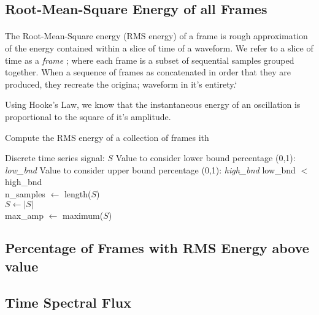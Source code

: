 \documentclass[12pt,letterpaper]{article}
\begin{document}


\subsection{Root-Mean-Square Energy of all Frames}

\paragraph*{}The Root-Mean-Square energy (RMS energy) of a frame is rough approximation of the energy contained within a slice of time of a waveform. We refer to a slice of time as a \textit{frame} \cite{Kahn}; where each frame is a subset of sequential samples grouped together. When a sequence of frames as concatenated in order that they are produced, they recreate the origina; waveform in it's entirety.`

 Using Hooke's Law, we know that the instantaneous energy of an oscillation is proportional to the square of it's amplitude.

\begin{algorithm}
\label{RMS Energy of Frames}
\caption{Compute the RMS energy of a collection of frames ith}

\begin{algorithmic}

\REQUIRE Discrete time series signal: $S$ 
\REQUIRE Value to consider lower bound percentage (0,1): \textit{low\_bnd}
\REQUIRE Value to consider upper bound percentage (0,1): \textit{high\_bnd}
\ENSURE low\_bnd $<$ high\_bnd \\

n\_samples $\leftarrow$ length($S$) \\
$S \leftarrow |S|$ \\
max\_amp $\leftarrow$ maximum($S$) \\


\end{algorithmic}
\end{algorithm}


\subsection{Percentage of Frames with RMS Energy above value}



\subsection{Time Spectral Flux}
\end{document}
